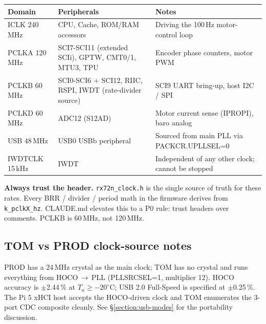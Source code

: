 \begin{center}
\begin{tabular}{|l|l|l|}
\hline
\textbf{Domain} & \textbf{Peripherals}                                              & \textbf{Notes}                                              \\
\hline
ICLK 240\,MHz   & CPU, Cache, ROM/RAM accessors                                     & Driving the 100\,Hz motor-control loop                       \\
PCLKA 120\,MHz  & SCI7-SCI11 (extended SCIi), GPTW, CMT0/1, MTU3, TPU                & Encoder phase counters, motor PWM                            \\
PCLKB 60\,MHz   & SCI0-SCI6 + SCI12, RIIC, RSPI, IWDT (rate-divider source)          & SCI9 UART bring-up, host I2C / SPI                           \\
PCLKD 60\,MHz   & ADC12 (S12AD)                                                     & Motor current sense (IPROPI), baro analog                    \\
USB 48\,MHz     & USB0 USBb peripheral                                              & Sourced from main PLL via PACKCR.UPLLSEL=0                   \\
IWDTCLK 15\,kHz & IWDT                                                              & Independent of any other clock; cannot be stopped            \\
\hline
\end{tabular}
\end{center}

\textbf{Always trust the header.} \texttt{rx72n\_clock.h} is the single
source of truth for these rates. Every BRR / divider / period math in
the firmware derives from \texttt{k\_pclkX\_hz}. CLAUDE.md elevates
this to a P0 rule: trust headers over comments. PCLKB is 60\,MHz, not
120\,MHz.

\subsection{TOM vs PROD clock-source notes}

PROD has a 24\,MHz crystal as the main clock; TOM has no crystal and
runs everything from HOCO\,$\rightarrow$\,PLL (PLLSRCSEL=1, multiplier 12).
HOCO accuracy is $\pm$2.44\,\% at $T_a \ge -20^\circ$C; USB 2.0
Full-Speed is specified at $\pm$0.25\,\%. The Pi 5 xHCI host accepts
the HOCO-driven clock and TOM enumerates the 3-port CDC composite
cleanly. See \S\ref{section:usb-modes} for the portability discussion.

